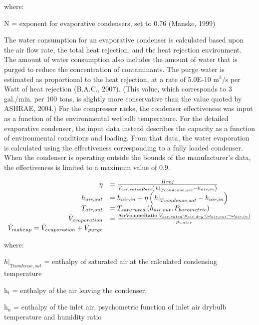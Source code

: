 where:

N = exponent for evaporative condensers, set to 0.76 (Manske, 1999)

The water consumption for an evaporative condenser is calculated based upon the air flow rate, the total heat rejection, and the heat rejection environment. The amount of water consumption also includes the amount of water that is purged to reduce the concentration of contaminants. The purge water is estimated as proportional to the heat rejection, at a rate of 5.0E-10 m\(^{3}\)/s per Watt of heat rejection (B.A.C., 2007). (This value, which corresponds to 3 gal./min. per 100 tons, is slightly more conservative than the value quoted by ASHRAE, 2004.) For the compressor racks, the condenser effectiveness was input as a function of the environmental wetbulb temperature. For the detailed evaporative condenser, the input data instead describes the capacity as a function of environmental conditions and loading. From that data, the water evaporation is calculated using the effectiveness corresponding to a fully loaded condenser. When the condenser is operating outside the bounds of the manufacturer's data, the effectiveness is limited to a maximum value of 0.9.

\begin{equation}
  \begin{array}{rl}
    \eta &= \frac{Hrej}{\dot{V}_{air,rated} \rho_{air} \PB{\left. h \right|_{Tcondense,sat} - h_{air,in}}} \\
    h_{air,out} &= h_{air,in} + \eta \PB{\left. h \right|_{Tcondense,sat} - h_{air,in}} \\
    T_{air,out} &= T_{saturated}\PB{h_{air,out},P_{barometric}} \\
    \dot{V}_{evaporation} &= \frac{\text{AirVolumeRatio} \cdot \dot{V}_{air,rated} \cdot \rho_{air,dry} \cdot \PB{\omega_{air,out} - \omega_{air,in}}}{\rho_{water}} \\
    \dot{V}_{makeup} = \dot{V}_{evaporation} + \dot{V}_{purge}
  \end{array}
\end{equation}

where:

\({\left. h \right|_{Tcondense,sat}}\) = enthalpy of saturated air at the calculated condensing temperature

h\(_{t}\) = enthalpy of the air leaving the condenser,

h\(_{n}\) = enthalpy of the inlet air, psychometric function of inlet air drybulb temperature and humidity ratio

